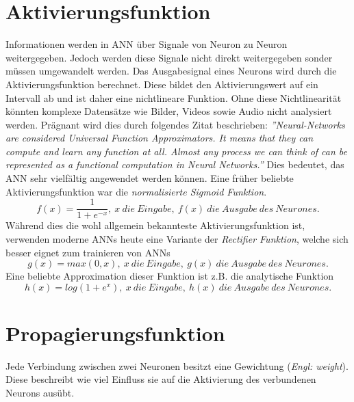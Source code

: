 \documentclass{thesisclass}
\begin{document}
\section{Aktivierungsfunktion}
Informationen werden in \gls{ANN} über Signale von Neuron zu Neuron weitergegeben. Jedoch werden diese Signale nicht direkt weitergegeben sonder müssen umgewandelt werden. Das Ausgabesignal eines Neurons wird durch die Aktivierungsfunktion berechnet. Diese bildet den Aktivierungswert auf ein Intervall ab und ist daher eine nichtlineare Funktion. Ohne diese Nichtlinearität könnten komplexe Datensätze wie Bilder, Videos sowie Audio nicht analysiert werden. Prägnant wird dies durch folgendes Zitat beschrieben:
\clearpage
\textit{''Neural-Networks are considered Universal Function Approximators. It means that they can compute and learn any function at all. Almost any process we can think of can be represented as a functional computation in Neural Networks.'' \cite{walia_2017}} Dies bedeutet, das \gls{ANN} sehr vielfältig angewendet werden können. Eine früher beliebte Aktivierungsfunktion war die \textit{normalisierte Sigmoid Funktion}.
\begin{equation} 
f(x) = \frac{1}{1 + e^{-x}},\ x\ die\ Eingabe,\ f(x)\ die\ Ausgabe\ des\ Neurones.
\end{equation}
Während dies die wohl allgemein bekannteste Aktivierungsfunktion ist, verwenden moderne \gls{ANN}s heute eine Variante der \textit{Rectifier Funktion}, welche sich besser eignet zum trainieren von \gls{ANN}s \cite{lecun_bengio_hinton_2015}
\begin{equation}
g(x) = max(0, x),\ x\ die\ Eingabe,\ g(x)\ die\ Ausgabe\ des\ Neurones.
\end{equation}
Eine beliebte Approximation dieser Funktion ist z.B. die analytische Funktion
\begin{equation}
h(x) = log(1 + e^{x}),\ x\ die\ Eingabe,\ h(x)\ die\ Ausgabe\ des\ Neurones.
\end{equation}

\section{Propagierungsfunktion}

Jede Verbindung zwischen zwei Neuronen besitzt eine Gewichtung (\textit{Engl: weight}). Diese beschreibt wie viel Einfluss sie auf die Aktivierung des verbundenen Neurons ausübt.
\end{document}
